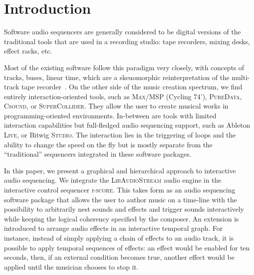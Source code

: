 \documentclass{article}
\title{\papertitle}
\newcommand*{\LibAudioStream}{\textsc{LibAudioStream}\xspace}
\newcommand*{\iscore}{\textsc{i-score}\xspace}
\newcommand*{\maxmsp}{\textsc{Max/MSP} (Cycling 74')\xspace}
\newcommand*{\puredata}{\textsc{PureData}\xspace}
\newcommand*{\csound}{\textsc{Csound}\xspace}
\newcommand*{\supercollider}{\textsc{SuperCollider}\xspace}
\newcommand*{\abletonlive}{Ableton \textsc{Live}\xspace}
\newcommand*{\bitwigstudio}{Bitwig \textsc{Studio}\xspace}
\begin{document}
\capstartfalse
\maketitle
\capstarttrue

\begin{abstract}
The field of digital music authoring provides a wealth of creative environments in which music can be created and authored: patchers, programming languages, and multitrack sequencers.
By combining the \iscore interactive sequencer to the \LibAudioStream audio engine, a new music software able to represent and play rich interactive audio sequences is introduced.
We present new stream expressions compatible with the \LibAudioStream, and 
use them to create an interactive audio graph: hierarchical stream and send - return streams.
This allows to create branching and arbitrarily nested musical scores, in an OSC-centric environment.
Three examples of interactive musical scores are presented: the recreation of a traditional multi-track sequencer, an interactive musical score, and a temporal effect graph.
\end{abstract}

\section{Introduction}
Software audio sequencers are generally considered to be digital versions 
of the traditional tools that are used in a recording studio: tape recorders, 
mixing desks, effect racks, etc.

Most of the existing software follow this paradigm very closely, with 
concepts of tracks, buses, linear time, which are a skeuomorphic reinterpretation of the multi-track tape recorder~\cite{bell2015skeuomorphism}.
On the other side of the music creation spectrum, we find entirely interaction-oriented tools, 
such as \maxmsp, \puredata, \csound, or \supercollider. 
They allow the user to create musical works in programming-oriented environments.
In-between are tools with limited interaction capabilities but full-fledged audio sequencing support, 
such as \abletonlive, or \bitwigstudio.
The interaction lies in the triggering of loops and the ability to change the speed on the fly but is mostly separate from the ``traditional'' sequencers integrated in these software packages.

In this paper, we present a graphical and hierarchical approach to interactive audio sequencing.
We integrate the \LibAudioStream audio engine in the interactive control sequencer \iscore.
This takes form as an audio sequencing software package that allows the user to author music on a time-line 
with the possibility to arbitrarily nest sounds and effects and trigger sounds interactively 
while keeping the logical coherency specified by the composer. 
An extension is introduced to arrange audio effects in an interactive temporal graph.
For instance, instead of simply applying a chain of effects to an audio track, it is possible to apply temporal sequences of effects: an effect would be enabled for ten seconds, then, if an external condition becomes true, another effect would be applied until the musician chooses to stop it.
\end{document}

